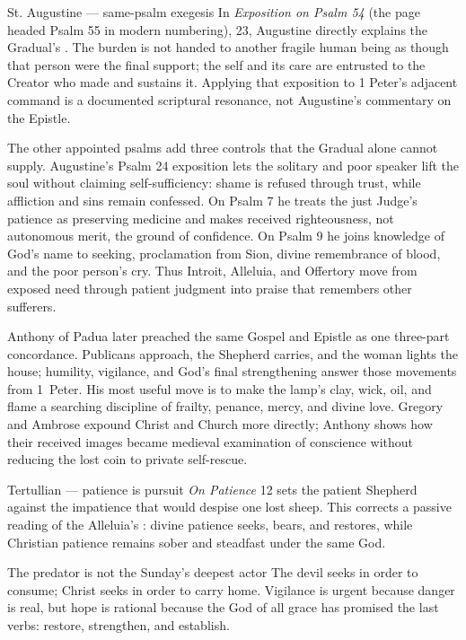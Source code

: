 \begin{deepstudy}
\begin{sourcecard}{St. Augustine --- same-psalm exegesis}
In \emph{Exposition on Psalm 54} (the page headed Psalm 55 in modern numbering), 23, Augustine directly explains the Gradual's . The burden is not handed to another fragile human being as though that person were the final support; the self and its care are entrusted to the Creator who made and sustains it. Applying that exposition to 1 Peter's adjacent command is a documented scriptural resonance, not Augustine's commentary on the Epistle.
\end{sourcecard}

The other appointed psalms add three controls that the Gradual alone cannot supply. Augustine's Psalm 24 exposition lets the solitary and poor speaker lift the soul without claiming self-sufficiency: shame is refused through trust, while affliction and sins remain confessed. On Psalm 7 he treats the just Judge's patience as preserving medicine and makes received righteousness, not autonomous merit, the ground of confidence. On Psalm 9 he joins knowledge of God's name to seeking, proclamation from Sion, divine remembrance of blood, and the poor person's cry. Thus Introit, Alleluia, and Offertory move from exposed need through patient judgment into praise that remembers other sufferers.

Anthony of Padua later preached the same Gospel and Epistle as one three-part concordance. Publicans approach, the Shepherd carries, and the woman lights the house; humility, vigilance, and God's final strengthening answer those movements from 1~Peter. His most useful move is to make the lamp's clay, wick, oil, and flame a searching discipline of frailty, penance, mercy, and divine love. Gregory and Ambrose expound Christ and Church more directly; Anthony shows how their received images became medieval examination of conscience without reducing the lost coin to private self-rescue.

\begin{sourcecard}{Tertullian --- patience is pursuit}
\emph{On Patience} 12 sets the patient Shepherd against the impatience that would despise one lost sheep. This corrects a passive reading of the Alleluia's : divine patience seeks, bears, and restores, while Christian patience remains sober and steadfast under the same God.
\end{sourcecard}

\begin{massbox}{The predator is not the Sunday's deepest actor}
The devil seeks in order to consume; Christ seeks in order to carry home. Vigilance is urgent because danger is real, but hope is rational because the God of all grace has promised the last verbs: restore, strengthen, and establish.
\end{massbox}


\end{deepstudy}
